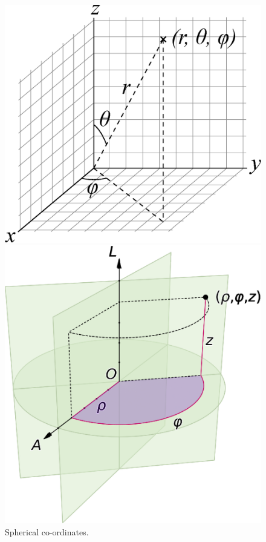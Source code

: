 \documentclass{scrartcl}
\begin{document}
\begin{itemize}
\begin{figure}[H]
\begin{minipage}[b]{0.4\textwidth}
                \includegraphics[width=\textwidth]{sphere.eps}
                \caption{Spherical co-ordinates.}
            \end{minipage}
            \hfill
            \begin{minipage}[b]{0.4\textwidth}
                \includegraphics[width=\textwidth]{cylinder.eps}

\end{minipage}
\end{figure}
\end{itemize}
\end{document}
